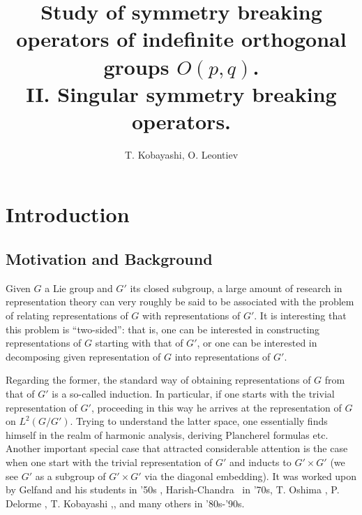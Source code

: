 \documentclass{article}
\numberwithin{definition}{section}
\numberwithin{lemma}{section}
\numberwithin{proposition}{section}
{\theorembodyfont{\rmfamily}\newtheorem{remark}{Remark}
\numberwithin{remark}{section}
}
\begin{document}
\title{Study of symmetry breaking operators of indefinite orthogonal groups $O( p, q)$.\\ 
II. Singular symmetry breaking operators.}
\author{T. Kobayashi, O. Leontiev}
\maketitle

{\tableofcontents}

\setcounter{section}{8}
\section{Introduction}

\subsection{Motivation and Background}

Given $G$ a Lie group and $G'$ its closed subgroup, a large amount of research
in representation theory can very roughly be said to be associated with the
problem of relating representations of $G$ with representations of $G'$. It is
interesting that this problem is ``two-sided'': that is, one can be interested
in constructing representations of $G$ starting with that of $G'$, or one can
be interested in decomposing given representation of $G$ into representations
of $G'$.

Regarding the former, the standard way of obtaining representations of $G$
from that of $G'$ is a so-called induction. In particular, if one starts with
the trivial representation of $G'$, proceeding in this way he arrives at the
representation of $G$ on $L^2 ( G / G')$. Trying to understand the latter
space, one essentially finds himself in the realm of harmonic analysis,
deriving Plancherel formulas etc. Another important special case that
attracted considerable attention is the case when one start with the trivial
representation of $G'$ and inducts to $G' \times G'$ (we see $G'$ as a
subgroup of $G' \times G'$ via the diagonal embedding). It was worked upon by
Gelfand and his students {\cite{gelfand1966generalized}} in '50s ,
Harish-Chandra {\cite{harishchandra1978harmonic}} \ in '70s, T. Oshima
{\cite{oshima1984description}}, P. Delorme {\cite{delorme1998plancherel}}, T.
Kobayashi
{\cite{kobayashi1994discrete1}},{\cite{kobayashi1998discrete2}},{\cite{kobayashi1998discrete3}}
and many others in '80s-'90s.
\end{document}
